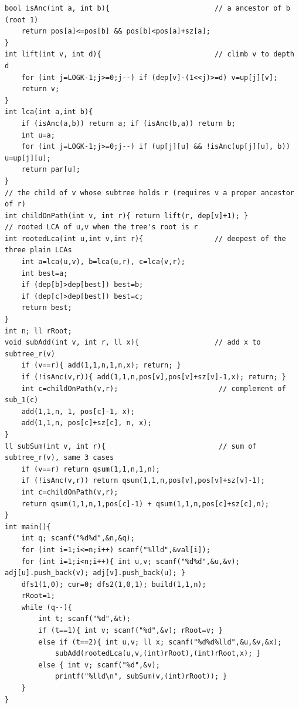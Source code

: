 \begin{lstlisting}[caption={CF 916E: one HLD order + Ch.20 lazy sum tree; re-rooted subtree as one or two pos-intervals; rooted LCA as the deepest of three plain LCAs}, label={lst:c16-916e}]
bool isAnc(int a, int b){                         // a ancestor of b (root 1)
    return pos[a]<=pos[b] && pos[b]<pos[a]+sz[a];
}
int lift(int v, int d){                           // climb v to depth d
    for (int j=LOGK-1;j>=0;j--) if (dep[v]-(1<<j)>=d) v=up[j][v];
    return v;
}
int lca(int a,int b){
    if (isAnc(a,b)) return a; if (isAnc(b,a)) return b;
    int u=a;
    for (int j=LOGK-1;j>=0;j--) if (up[j][u] && !isAnc(up[j][u], b)) u=up[j][u];
    return par[u];
}
// the child of v whose subtree holds r (requires v a proper ancestor of r)
int childOnPath(int v, int r){ return lift(r, dep[v]+1); }
// rooted LCA of u,v when the tree's root is r
int rootedLca(int u,int v,int r){                 // deepest of the three plain LCAs
    int a=lca(u,v), b=lca(u,r), c=lca(v,r);
    int best=a;
    if (dep[b]>dep[best]) best=b;
    if (dep[c]>dep[best]) best=c;
    return best;
}
int n; ll rRoot;
void subAdd(int v, int r, ll x){                  // add x to subtree_r(v)
    if (v==r){ add(1,1,n,1,n,x); return; }
    if (!isAnc(v,r)){ add(1,1,n,pos[v],pos[v]+sz[v]-1,x); return; }
    int c=childOnPath(v,r);                        // complement of sub_1(c)
    add(1,1,n, 1, pos[c]-1, x);
    add(1,1,n, pos[c]+sz[c], n, x);
}
ll subSum(int v, int r){                           // sum of subtree_r(v), same 3 cases
    if (v==r) return qsum(1,1,n,1,n);
    if (!isAnc(v,r)) return qsum(1,1,n,pos[v],pos[v]+sz[v]-1);
    int c=childOnPath(v,r);
    return qsum(1,1,n,1,pos[c]-1) + qsum(1,1,n,pos[c]+sz[c],n);
}
int main(){
    int q; scanf("%d%d",&n,&q);
    for (int i=1;i<=n;i++) scanf("%lld",&val[i]);
    for (int i=1;i<n;i++){ int u,v; scanf("%d%d",&u,&v); adj[u].push_back(v); adj[v].push_back(u); }
    dfs1(1,0); cur=0; dfs2(1,0,1); build(1,1,n);
    rRoot=1;
    while (q--){
        int t; scanf("%d",&t);
        if (t==1){ int v; scanf("%d",&v); rRoot=v; }
        else if (t==2){ int u,v; ll x; scanf("%d%d%lld",&u,&v,&x);
            subAdd(rootedLca(u,v,(int)rRoot),(int)rRoot,x); }
        else { int v; scanf("%d",&v);
            printf("%lld\n", subSum(v,(int)rRoot)); }
    }
}
\end{lstlisting}

